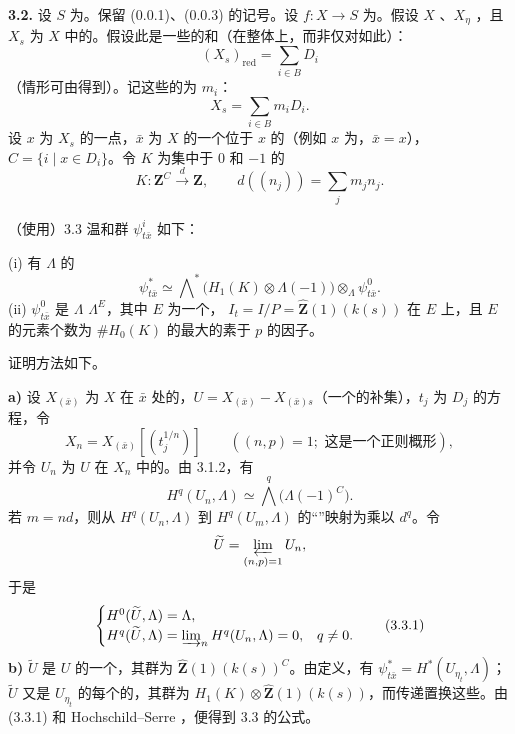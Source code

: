 \textbf{3.2.} 设 $S$ 为。保留 (0.0.1)、(0.0.3) 的记号。设 $f:X\to S$ 为。假设 $X$ 、$X_\eta$ ，且 $X_s$ 为 $X$ 中的。假设此是一些的和（在整体上，而非仅对如此）：
\[
(X_s)_{\mathrm{red}}=\sum_{i\in B}D_i
\]
（情形可由得到）。记这些的为 $m_i$：
\[
X_s=\sum_{i\in B}m_iD_i.
\]
设 $x$ 为 $X_s$ 的一点，$\bar x$ 为 $X$ 的一个位于 $x$ 的（例如 $x$ 为，$\bar x=x$），$C=\{i\mid x\in D_i\}$。令 $K$ 为集中于 $0$ 和 $-1$ 的
\[
K:\mathbf Z^C\xrightarrow{d}\mathbf Z,\qquad d((n_j))=\sum_jm_jn_j.
\]
\begin{SGAresult}{（使用）}{3.3}
温和群 $\psi^i_{t\bar x}$ 如下：

\textup{(i)} 有 $\Lambda$ 的
\[
\psi^*_{t\bar x}\simeq
\bigwedge\nolimits^*\bigl(H_1(K)\otimes\Lambda(-1)\bigr)
\otimes_\Lambda\psi^0_{t\bar x}.
\]
\textup{(ii)} $\psi^0_{t\bar x}$ 是 $\Lambda$  $\Lambda^E$，其中 $E$ 为一个， $I_t=I/P=\widehat{\mathbf Z}(1)(k(s))$ 在 $E$ 上，且 $E$ 的元素个数为 $\#H_0(K)$ 的最大的素于 $p$ 的因子。
\end{SGAresult}
证明方法如下。

\textbf{a)} 设 $X_{(\bar x)}$ 为 $X$ 在 $\bar x$ 处的，$U=X_{(\bar x)}-X_{(\bar x)s}$（一个的补集），$t_j$ 为 $D_j$ 的方程，令
\[
X_n=X_{(\bar x)}[(t_j^{1/n})]\qquad((n,p)=1;
\text{ 这是一个正则概形}),
\]
并令 $U_n$ 为 $U$ 在 $X_n$ 中的。由 3.1.2，有
\[
H^q(U_n,\Lambda)\simeq\bigwedge^q\bigl(\Lambda(-1)^C\bigr).
\]
若 $m=nd$，则从 $H^q(U_n,\Lambda)$ 到 $H^q(U_m,\Lambda)$ 的“”映射为乘以 $d^q$。令
\[
\widetilde U=\varprojlim_{(n,p)=1}U_n,
\]
于是
\[
\begin{cases}
H^0(\widetilde U,\Lambda)=\Lambda,\\
H^q(\widetilde U,\Lambda)=\varinjlim_nH^q(U_n,\Lambda)=0,&q\ne0.
\end{cases}\tag{3.3.1}
\]
\textbf{b)} $\widetilde U$ 是 $U$ 的一个，其群为 $\widehat{\mathbf Z}(1)(k(s))^C$。由定义，有 $\psi^*_{t\bar x}=H^*(U_{\eta_t},\Lambda)$；$\widetilde U$ 又是 $U_{\eta_t}$ 的每个的，其群为 $H_1(K)\otimes\widehat{\mathbf Z}(1)(k(s))$，而传递置换这些。由 (3.3.1) 和 Hochschild–Serre ，便得到 3.3 的公式。

